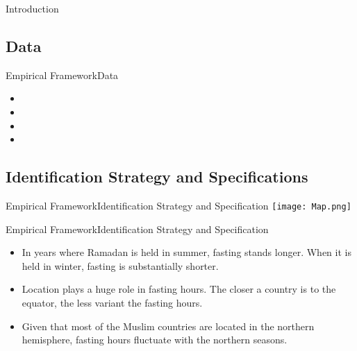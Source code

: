 \documentclass[pdftex,12pt,xcolor=pdftex,table]{beamer}
\begin{document}
\begin{frame}{Introduction}
\subsection{Data}
    \begin{frame}{Empirical Framework}{Data}
    \begin{itemize}
    \item<1-> \vspace {They collect data from the Astronomical Applications Department of the U.S. Naval Observatory to calculate the number of stipulated fasting hours during Ramadan.}
    \item<2-> \vspace {To map historical Ramadan dates from the Islamic calendar to the Gregorian calendar, They use data from Islamic Philosophy Online.}
    \item<3-> \vspace {Match the data on Ramadan fasting hours with various data sets like: data from Version 1.1 of the World Religion Project, Penn World Tables 8.0 (PWT8.0), national-accounts data on real GDP growth per worker in constant 2005 prices.}
    \item<4-> \vspace {To asses whether Ramadan affects SWB, the authors use data from all six waves of the World Values Survey (WVS).}
    \end{itemize}
    \end{frame}
    
\subsection{Identification Strategy and Specifications}
    \begin{frame}{Empirical Framework}{Identification Strategy and Specification}
    \centering
    \texttt{[image: Map.png]}
    \end{frame}
    
    \begin{frame}{Empirical Framework}{Identification Strategy and Specification}
    \begin{itemize}
    \item<1-> In years where Ramadan is held in summer, fasting stands longer. When it is held in winter, fasting is substantially shorter.
    \item<2-> Location plays a huge role in fasting hours. The closer a country is to the equator, the less variant the fasting hours.
    \item<3-> Given that most of the Muslim countries are located in the northern hemisphere, fasting hours fluctuate with the northern seasons.
    \end{itemize}
    \end{frame}
    

\end{frame}
\end{document}
